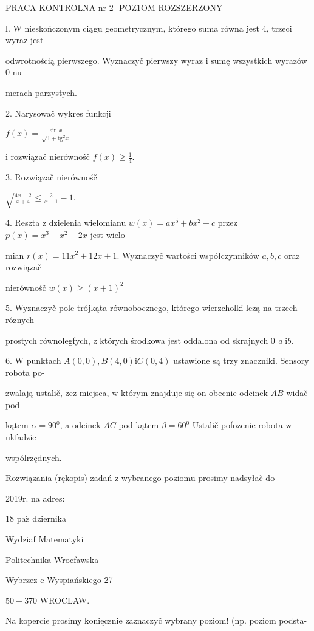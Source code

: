 \documentclass[a4paper,12pt]{article}
\begin{document}
PRACA KONTROLNA nr 2- POZ1OM ROZSZERZONY

l. W nieskończonym ciągu geometrycznym, którego suma równa jest 4, trzeci wyraz jest

odwrotnością pierwszego. Wyznaczyč pierwszy wyraz i sumę wszystkich wyrazów 0 nu-

merach parzystych.

2. Narysowač wykres funkcji

$f(x)=\displaystyle \frac{\sin x}{\sqrt{1+\mathrm{t}\mathrm{g}^{2}x}}$

$\mathrm{i}$ rozwiązač nierównośč $f(x)\displaystyle \geq\frac{1}{4}.$

3. Rozwiązač nierównośč

$\displaystyle \sqrt{\frac{4x-2}{x+4}}\leq\frac{2}{x-1}-1.$

4. Reszta $\mathrm{z}$ dzielenia wielomianu $w(x)=ax^{5}+bx^{2}+c$ przez $p(x)=x^{3}-x^{2}-2x$ jest wielo-

mian $r(x)=11x^{2}+12x+1$. Wyznaczyč wartości współczynników $a, b, c$ oraz rozwiązač

nierównośč $w(x)\geq(x+1)^{2}$

5. Wyznaczyč pole trójkąta równobocznego, którego wierzcholki lezą na trzech róznych

prostych równolegfych, $\mathrm{z}$ których środkowa jest oddalona od skrajnych $0$ {\it a} $\mathrm{i}b.$

6. $\mathrm{W}$ punktach $A(0,0), B(4,0) \mathrm{i}C(0,4)$ ustawione są trzy znaczniki. Sensory robota po-

zwalają ustalič, $\dot{\mathrm{z}}\mathrm{e}\mathrm{z}$ miejsca, $\mathrm{w}$ którym znajduje się on obecnie odcinek $AB$ widač pod

kątem $\alpha=90^{\mathrm{o}}$, a odcinek $AC$ pod kątem $\beta=60^{\mathrm{o}}$ Ustalič pofozenie robota $\mathrm{w}$ ukfadzie

wspólrzędnych.

Rozwiązania (rękopis) zadań z wybranego poziomu prosimy nadsyłač do

2019r. na adres:

18 $\mathrm{p}\mathrm{a}\acute{\mathrm{z}}$ dziernika

Wydziaf Matematyki

Politechnika Wrocfawska

Wybrzez $\mathrm{e}$ Wyspiańskiego 27

$50-370$ WROCLAW.

Na kopercie prosimy $\underline{\mathrm{k}\mathrm{o}\mathrm{n}\mathrm{i}\mathrm{e}\mathrm{c}\mathrm{z}\mathrm{n}\mathrm{i}\mathrm{e}}$ zaznaczyč wybrany poziom! (np. poziom podsta-
\end{document}
